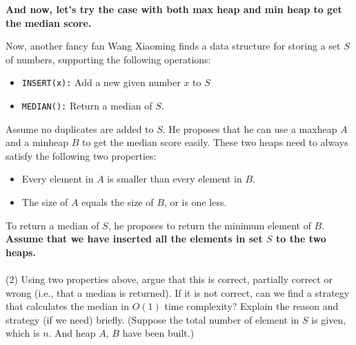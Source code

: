 \documentclass{article}
\begin{document}
\newpage

\textbf{And now, let's try the case with both max heap and min heap to get the median score.}

Now, another fancy fan Wang Xiaoming finds a data structure for storing a set $S$ of numbers, supporting the following operations:
\begin{itemize}
	\item \texttt{INSERT(x):} Add a new given number $x$ to $S$
	\item \texttt{MEDIAN():} Return a median of $S$.
\end{itemize}

Assume no duplicates are added to $S$. He proposes that he can use a maxheap $A$ and a minheap $B$ to get the median score easily. These two heaps need to always satisfy the following two properties:

\begin{itemize}
	\item Every element in $A$ is smaller than every element in $B$.
	\item The size of $A$ equals the size of $B$, or is one less.
\end{itemize}

To return a median of $S$, he proposes to return the minimum element of $B$. \textbf{Assume that we have inserted all the elements in set $S$ to the two heaps.}

\paragraph{}
(2) Using two properties above, argue that this is correct, partially correct or wrong (i.e., that a median is returned). If it is not correct, can we find a strategy that calculates the median in $O(1)$ time complexity? Explain the reason and strategy (if we need) briefly. (Suppose the total number of element in $S$ is given, which is $n$. And heap $A$, $B$ have been built.)

\end{document}
